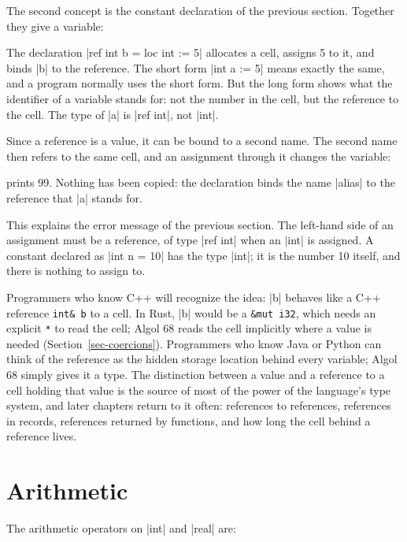 The second concept is the constant declaration of the previous section.
Together they give a variable:


The declaration \code|ref int b = loc int := 5| allocates a cell, assigns
5 to it, and binds \code|b| to the reference. The short form
\code|int a := 5| means exactly the same, and a program normally uses the
short form. But the long form shows what the identifier of a variable
stands for: not the number in the cell, but the reference to the cell.
The type of \code|a| is \code|ref int|, not \code|int|.

Since a reference is a value, it can be bound to a second name. The
second name then refers to the same cell, and an assignment through it
changes the variable:


\noindent prints 99. Nothing has been copied: the declaration binds the
name \code|alias| to the reference that \code|a| stands for.

This explains the error message of the previous section. The left-hand
side of an assignment must be a reference, of type \code|ref int| when an
\code|int| is assigned. A constant declared as \code|int n = 10| has the
type \code|int|; it is the number 10 itself, and there is nothing to
assign to.

Programmers who know C++ will recognize the idea: \code|b| behaves like
a C++ reference \texttt{int\& b} to a cell. In Rust, \code|b| would be a
\texttt{\&mut i32}, which needs an explicit \texttt{*} to read the cell;
Algol 68 reads the cell implicitly where a value is needed
(Section~\ref{sec-coercions}). Programmers who know Java or Python can think of the
reference as the hidden storage location behind every variable; Algol 68
simply gives it a type. The distinction between a value and a reference
to a cell holding that value is the source of most of the power of the
language's type system, and later chapters return to it often: references
to references, references in records, references returned by functions,
and how long the cell behind a reference lives.

\section{Arithmetic}\label{sec-arithmetic}

The arithmetic operators on \code|int| and \code|real| are:

